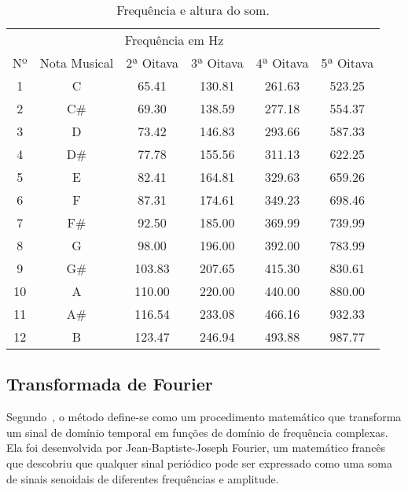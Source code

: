 \documentclass{sbrt}
\begin{document}
\begin{table}[ht]
  \centering
  \caption{\label{tab:freq} Frequência e altura do som.}
  \vspace{-0.2cm}
  \begin{tabular}{c c c c c c}
       & \multicolumn{4}{c}{Frequência em Hz}                                                 \\
    Nº & Nota Musical                         & 2ª Oitava & 3ª Oitava & 4ª Oitava & 5ª Oitava \\
    \hline
    1  & C                                    & 65.41     & 130.81    & 261.63    & 523.25    \\
    2  & C\#                                  & 69.30     & 138.59    & 277.18    & 554.37    \\
    3  & D                                    & 73.42     & 146.83    & 293.66    & 587.33    \\
    4  & D\#                                  & 77.78     & 155.56    & 311.13    & 622.25    \\
    5  & E                                    & 82.41     & 164.81    & 329.63    & 659.26    \\
    6  & F                                    & 87.31     & 174.61    & 349.23    & 698.46    \\
    7  & F\#                                  & 92.50     & 185.00    & 369.99    & 739.99    \\
    8  & G                                    & 98.00     & 196.00    & 392.00    & 783.99    \\
    9  & G\#                                  & 103.83    & 207.65    & 415.30    & 830.61    \\
    10 & A                                    & 110.00    & 220.00    & 440.00    & 880.00    \\
    11 & A\#                                  & 116.54    & 233.08    & 466.16    & 932.33    \\
    12 & B                                    & 123.47    & 246.94    & 493.88    & 987.77    \\
  \end{tabular}
\end{table}

\subsection{Transformada de Fourier}

Segundo~\cite{richardson1978fundamentals}, o método define-se como um procedimento matemático que transforma um sinal de domínio temporal em funções de domínio de frequência complexas. Ela foi desenvolvida por Jean-Baptiste-Joseph Fourier, um matemático francês que descobriu que qualquer sinal periódico pode ser expressado como uma soma de sinais senoidais de diferentes frequências e amplitude.
\end{document}
